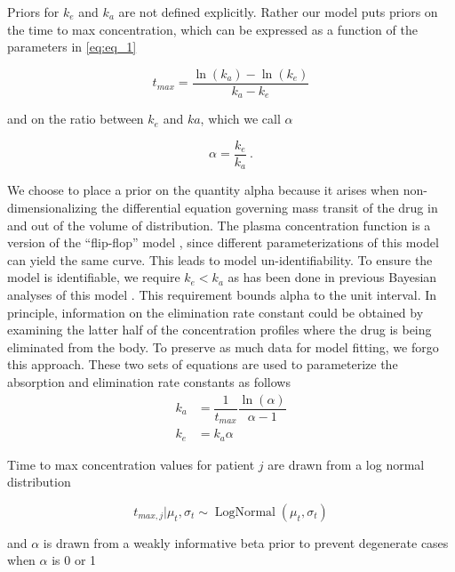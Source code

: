 Priors for $k_e$ and $k_a$ are not defined explicitly.  Rather our model puts priors on the time to max concentration, which can be expressed as a function of the parameters in \cref{eq:eq_1}

\begin{equation}\label{eq:eq_2}
 t_{max} = \dfrac{\ln(k_a) - \ln(k_e)}{k_a - k_e}
\end{equation}

\noindent and on the ratio between $k_e$ and $ka$, which we call $\alpha$

\begin{equation}\label{eq:eq_3}
\alpha  = \dfrac{k_e}{k_a} \>.
\end{equation}

\noindent We choose to place a prior on the quantity alpha because it arises when non-dimensionalizing \cite{Lin1988-pr} the differential equation governing mass transit of the drug in and out of the volume of distribution.  The plasma concentration function is a version of the “flip-flop” model \cite{Wakefield1996-yy, Salway2008-gi}, since different parameterizations of this model can yield the same curve.  This leads to model un-identifiability. To ensure the model is identifiable, we require $k_e<k_a$ as has been done in previous Bayesian analyses of this model \cite{Wakefield1996-yy, Salway2008-gi}. This requirement bounds alpha to the unit interval.  In principle, information on the elimination rate constant could be obtained by examining the latter half of the concentration profiles where the drug is being eliminated from the body. To preserve as much data for model fitting, we forgo this approach.  These two sets of equations are used to parameterize the absorption and elimination rate constants as follows
\begin{align}
	k_a &= \dfrac{1}{t_{max}} \dfrac{\ln(\alpha)}{\alpha-1} \label{eq:eq_4} \\
	k_e &= k_a \alpha \label{eq:eq_5}
\end{align}

Time to max concentration values for patient $j$ are drawn from a log normal distribution

\begin{equation}\label{eq:eq_6}
t_{max, j} \vert \mu_t, \sigma_t \sim \operatorname{LogNormal}(\mu_t, \sigma_t)
\end{equation}

\noindent and $\alpha$ is drawn from a weakly informative beta prior to prevent degenerate cases when $\alpha$  is 0 or 1

